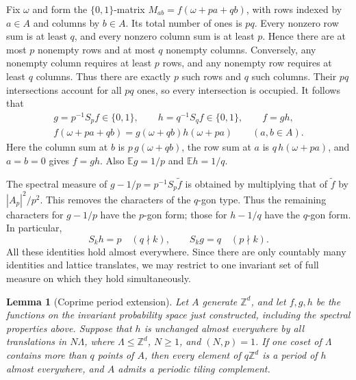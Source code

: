 \documentclass[11pt,reqno]{amsart}
\newcommand{\Z}{\mathbb Z}
\newcommand{\E}{\mathbb E}
\newtheorem{lemma}[theorem]{Lemma}
\theoremstyle{definition}
\theoremstyle{remark}
\numberwithin{equation}{section}
\begin{document}
Fix $\omega$ and form the $\{0,1\}$-matrix
$M_{ab}=f(\omega+pa+qb)$, with rows indexed by $a\in A$ and columns by
$b\in A$. Its total number of ones is $pq$. Every nonzero row sum is
at least $q$, and every nonzero column sum is at least $p$. Hence
there are at most $p$ nonempty rows and at most $q$ nonempty columns.
Conversely, any nonempty column requires at least $p$ rows, and any
nonempty row requires at least $q$ columns. Thus there are exactly
$p$ such rows and $q$ such columns. Their $pq$ intersections account
for all $pq$ ones, so every intersection is occupied. It follows that
\begin{equation}\label{eq:205-rectangle}
 \begin{gathered}
 g=p^{-1}S_pf\in\{0,1\},\qquad
 h=q^{-1}S_qf\in\{0,1\},\qquad f=gh,\\
 f(\omega+pa+qb)=g(\omega+qb)h(\omega+pa)\qquad(a,b\in A).
 \end{gathered}
\end{equation}
Here the column sum at $b$ is $p\,g(\omega+qb)$, the row sum at $a$ is
$q\,h(\omega+pa)$, and $a=b=0$ gives $f=gh$.
Also $\E g=1/p$ and $\E h=1/q$.

The spectral measure of $g-1/p=p^{-1}S_p\widetilde f$ is obtained
by multiplying that of $\widetilde f$ by $|A_p|^2/p^2$.
This removes the characters of the $q$-gon type. Thus the remaining
characters for $g-1/p$ have the $p$-gon form; those for $h-1/q$
have the $q$-gon form. In particular,
\begin{equation}\label{eq:205-factor-dilations}
 S_kh=p\quad(q\nmid k),\qquad S_kg=q\quad(p\nmid k).
\end{equation}
All these identities hold almost everywhere. Since there are only
countably many identities and lattice translates, we may restrict to
one invariant set of full measure on which they hold simultaneously.

\begin{samepage}
\begin{lemma}[Coprime period extension]\label{lem:205-orbit}
Let $A$ generate $\Z^d$, and let $f,g,h$ be the functions on the
invariant probability space just constructed, including the spectral
properties above. Suppose that $h$ is unchanged almost everywhere by all translations
in $N\Lambda$, where $\Lambda\le\Z^d$, $N\ge1$, and $(N,p)=1$.
If one coset of $\Lambda$ contains more than $q$ points of $A$, then
every element of $q\Z^d$ is a period of $h$ almost everywhere, and
$A$ admits a periodic tiling complement.
\end{lemma}
\end{samepage}
\end{document}
